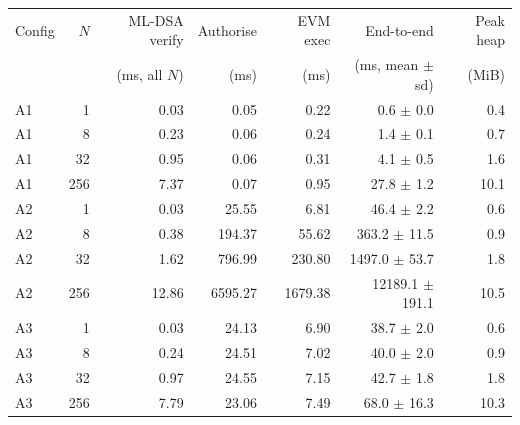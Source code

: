 \begin{tabular}{lrrrrrr}
\toprule
Config & $N$ & ML-DSA verify & Authorise & EVM exec & End-to-end & Peak heap \\
 & & (ms, all $N$) & (ms) & (ms) & (ms, mean $\pm$ sd) & (MiB) \\
\midrule
A1 & 1 & 0.03 & 0.05 & 0.22 & 0.6 $\pm$ 0.0 & 0.4 \\
A1 & 8 & 0.23 & 0.06 & 0.24 & 1.4 $\pm$ 0.1 & 0.7 \\
A1 & 32 & 0.95 & 0.06 & 0.31 & 4.1 $\pm$ 0.5 & 1.6 \\
A1 & 256 & 7.37 & 0.07 & 0.95 & 27.8 $\pm$ 1.2 & 10.1 \\
\midrule
A2 & 1 & 0.03 & 25.55 & 6.81 & 46.4 $\pm$ 2.2 & 0.6 \\
A2 & 8 & 0.38 & 194.37 & 55.62 & 363.2 $\pm$ 11.5 & 0.9 \\
A2 & 32 & 1.62 & 796.99 & 230.80 & 1497.0 $\pm$ 53.7 & 1.8 \\
A2 & 256 & 12.86 & 6595.27 & 1679.38 & 12189.1 $\pm$ 191.1 & 10.5 \\
\midrule
A3 & 1 & 0.03 & 24.13 & 6.90 & 38.7 $\pm$ 2.0 & 0.6 \\
A3 & 8 & 0.24 & 24.51 & 7.02 & 40.0 $\pm$ 2.0 & 0.9 \\
A3 & 32 & 0.97 & 24.55 & 7.15 & 42.7 $\pm$ 1.8 & 1.8 \\
A3 & 256 & 7.79 & 23.06 & 7.49 & 68.0 $\pm$ 16.3 & 10.3 \\
\bottomrule
\end{tabular}
